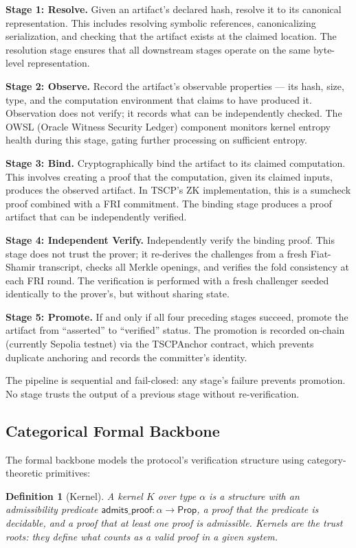 \documentclass[11pt,a4paper]{article}
\newtheorem{definition}{Definition}
\begin{document}
\textbf{Stage 1: Resolve.} Given an artifact's declared hash, resolve it to its canonical representation. This includes resolving symbolic references, canonicalizing serialization, and checking that the artifact exists at the claimed location. The resolution stage ensures that all downstream stages operate on the same byte-level representation.

\textbf{Stage 2: Observe.} Record the artifact's observable properties --- its hash, size, type, and the computation environment that claims to have produced it. Observation does not verify; it records what can be independently checked. The OWSL (Oracle Witness Security Ledger) component monitors kernel entropy health during this stage, gating further processing on sufficient entropy.

\textbf{Stage 3: Bind.} Cryptographically bind the artifact to its claimed computation. This involves creating a proof that the computation, given its claimed inputs, produces the observed artifact. In TSCP's ZK implementation, this is a sumcheck proof combined with a FRI commitment. The binding stage produces a proof artifact that can be independently verified.

\textbf{Stage 4: Independent Verify.} Independently verify the binding proof. This stage does not trust the prover; it re-derives the challenges from a fresh Fiat-Shamir transcript, checks all Merkle openings, and verifies the fold consistency at each FRI round. The verification is performed with a fresh challenger seeded identically to the prover's, but without sharing state.

\textbf{Stage 5: Promote.} If and only if all four preceding stages succeed, promote the artifact from ``asserted'' to ``verified'' status. The promotion is recorded on-chain (currently Sepolia testnet) via the TSCPAnchor contract, which prevents duplicate anchoring and records the committer's identity.

The pipeline is sequential and fail-closed: any stage's failure prevents promotion. No stage trusts the output of a previous stage without re-verification.

\subsection{Categorical Formal Backbone}
\label{sec:formal}

The formal backbone models the protocol's verification structure using category-theoretic primitives:

\begin{definition}[Kernel]
A kernel $K$ over type $\alpha$ is a structure with an admissibility predicate $\textsf{admits\_proof}: \alpha \to \textsf{Prop}$, a proof that the predicate is decidable, and a proof that at least one proof is admissible. Kernels are the trust roots: they define what counts as a valid proof in a given system.
\end{definition}
\end{document}
